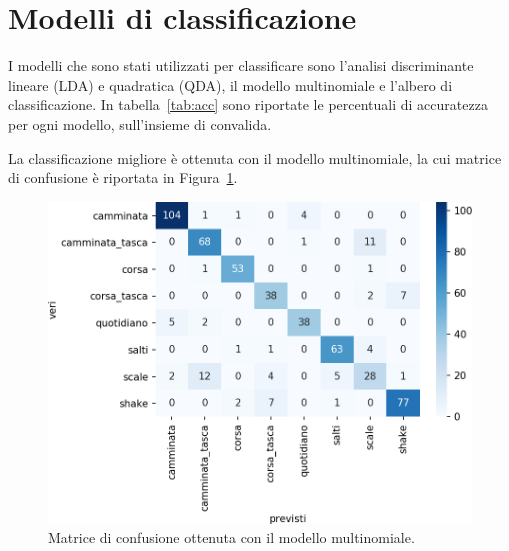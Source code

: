 \documentclass[main.tex]{subfiles}
\begin{document}
\section{Modelli di classificazione}
I modelli che sono stati utilizzati per classificare sono l'analisi discriminante lineare (LDA) e quadratica (QDA), il modello multinomiale e l'albero di classificazione. In tabella~\ref{tab:acc} sono riportate le percentuali di accuratezza per ogni modello, sull'insieme di convalida.


La classificazione migliore è ottenuta con il modello multinomiale, la cui matrice di confusione è riportata in Figura~\ref{fig:mn}.
\begin{figure}[H]
	\centering
	\includegraphics[width=\confusion]{../../figure/confusionMatrix-Mn.png}
	\caption{Matrice di confusione ottenuta con il modello multinomiale.}
	\label{fig:mn}
\end{figure}
\end{document}
